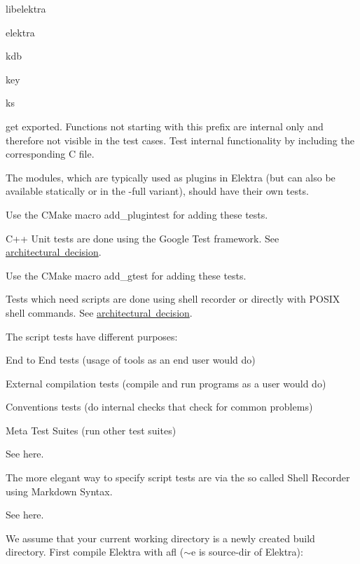 \begin{DoxyItemize}
\item {\ttfamily libelektra}
\item {\ttfamily elektra}
\item {\ttfamily kdb}
\item {\ttfamily key}
\item {\ttfamily ks}
\end{DoxyItemize}

get exported. Functions not starting with this prefix are internal only and therefore not visible in the test cases. Test internal functionality by including the corresponding C file.

The modules, which are typically used as plugins in Elektra (but can also be available statically or in the {\ttfamily -\/full} variant), should have their own tests.

Use the C\+Make macro {\ttfamily add\+\_\+plugintest} for adding these tests.

C++ Unit tests are done using the Google Test framework. See \mbox{\hyperlink{doc_decisions_unit_testing_md}{architectural decision}}.

Use the C\+Make macro {\ttfamily add\+\_\+gtest} for adding these tests.

Tests which need scripts are done using shell recorder or directly with P\+O\+S\+IX shell commands. See \mbox{\hyperlink{doc_decisions_script_testing_md}{architectural decision}}.

The script tests have different purposes\+:


\begin{DoxyItemize}
\item End to End tests (usage of tools as an end user would do)
\item External compilation tests (compile and run programs as a user would do)
\item Conventions tests (do internal checks that check for common problems)
\item Meta Test Suites (run other test suites)
\end{DoxyItemize}

See here.

The more elegant way to specify script tests are via the so called Shell Recorder using Markdown Syntax.

See here.

We assume that your current working directory is a newly created build directory. First compile Elektra with afl ($\sim$e is source-\/dir of Elektra)\+:


